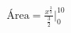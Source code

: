 \documentclass[preview]{standalone}
\begin{document}
\begin{align*}
\text{Área} = \frac{x^{\frac{3}{2}}}{\frac{3}{2}}\bigg|_{0}^{10}
\end{align*}
\end{document}
